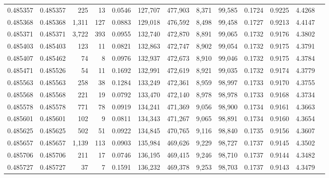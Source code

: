 \begin{tabular}{rrrrrrrrrrrrr}
0.485357 & 0.485357 &   225 &    13 &                                     0.0546 & 127,707 & 477,903 &   8,371 &  99,585 & 0.1724 & 0.9225 & 4.4268 \\
0.485368 & 0.485368 & 1,311 &   127 &                                     0.0883 & 129,018 & 476,592 &   8,498 &  99,458 & 0.1727 & 0.9213 & 4.4147 \\
0.485371 & 0.485371 & 3,722 &   393 &                                     0.0955 & 132,740 & 472,870 &   8,891 &  99,065 & 0.1732 & 0.9176 & 4.3802 \\
0.485403 & 0.485403 &   123 &    11 &                                     0.0821 & 132,863 & 472,747 &   8,902 &  99,054 & 0.1732 & 0.9175 & 4.3791 \\
0.485407 & 0.485462 &    74 &     8 &                                     0.0976 & 132,937 & 472,673 &   8,910 &  99,046 & 0.1732 & 0.9175 & 4.3784 \\
0.485471 & 0.485526 &    54 &    11 &                                     0.1692 & 132,991 & 472,619 &   8,921 &  99,035 & 0.1732 & 0.9174 & 4.3779 \\
0.485563 & 0.485563 &   258 &    38 &                                     0.1284 & 133,249 & 472,361 &   8,959 &  98,997 & 0.1733 & 0.9170 & 4.3755 \\
0.485568 & 0.485568 &   221 &    19 &                                     0.0792 & 133,470 & 472,140 &   8,978 &  98,978 & 0.1733 & 0.9168 & 4.3734 \\
0.485578 & 0.485578 &   771 &    78 &                                     0.0919 & 134,241 & 471,369 &   9,056 &  98,900 & 0.1734 & 0.9161 & 4.3663 \\
0.485601 & 0.485601 &   102 &     9 &                                     0.0811 & 134,343 & 471,267 &   9,065 &  98,891 & 0.1734 & 0.9160 & 4.3654 \\
0.485625 & 0.485625 &   502 &    51 &                                     0.0922 & 134,845 & 470,765 &   9,116 &  98,840 & 0.1735 & 0.9156 & 4.3607 \\
0.485657 & 0.485657 & 1,139 &   113 &                                     0.0903 & 135,984 & 469,626 &   9,229 &  98,727 & 0.1737 & 0.9145 & 4.3502 \\
0.485706 & 0.485706 &   211 &    17 &                                     0.0746 & 136,195 & 469,415 &   9,246 &  98,710 & 0.1737 & 0.9144 & 4.3482 \\
0.485727 & 0.485727 &    37 &     7 &                                     0.1591 & 136,232 & 469,378 &   9,253 &  98,703 & 0.1737 & 0.9143 & 4.3479 \\

\end{tabular}
